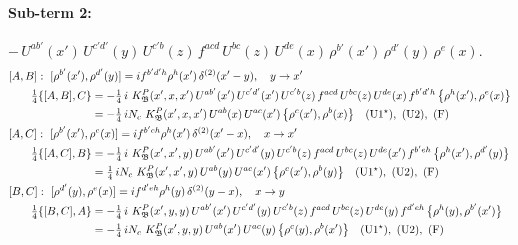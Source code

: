 \documentclass[10pt]{article}
\numberwithin{equation}{section}
\begin{document}
\paragraph{Sub-term 2:} $-\,U^{ab'}(x')\,U^{c'd'}(y)\,U^{c'b}(z)\,f^{acd}\,U^{bc}(z)\,U^{de}(x)\,\rho^{b'}(x')\,\rho^{d'}(y)\,\rho^{e}(x)$.
\begin{align}
&[A,B]:\ [\rho^{b'}(x'),\rho^{d'}(y)]=i f^{b'd'h}\rho^{h}(x')\,\delta^{(2)}(x'-y),\quad y\to x'\notag\\
&\qquad \tfrac14\{[A,B],C\}=-\tfrac14\,i\,\,K^{P}_{\mathfrak B}(x',x,x')\,U^{ab'}(x')\,U^{c'd'}(x')\,U^{c'b}(z)\,f^{acd}\,U^{bc}(z)\,U^{de}(x)\,f^{b'd'h}\,\big\{\rho^{h}(x'),\rho^{e}(x)\big\}\notag\\
&\qquad\phantom{\tfrac14\{[A,B],C\}}=-\tfrac14\,i N_{c}\,\,K^{P}_{\mathfrak B}(x',x,x')\,U^{ab}(x)\,U^{ac}(x')\,\big\{\rho^{c}(x'),\rho^{b}(x)\big\}\quad\text{(U1$^\star$)},\ \text{(U2)},\ \text{(F)}
\label{eq:GIII.I.P-2-AB}\\
&[A,C]:\ [\rho^{b'}(x'),\rho^{e}(x)]=i f^{b'eh}\rho^{h}(x')\,\delta^{(2)}(x'-x),\quad x\to x'\notag\\
&\qquad \tfrac14\{[A,C],B\}=-\tfrac14\,i\,\,K^{P}_{\mathfrak B}(x',x',y)\,U^{ab'}(x')\,U^{c'd'}(y)\,U^{c'b}(z)\,f^{acd}\,U^{bc}(z)\,U^{de}(x')\,f^{b'eh}\,\big\{\rho^{h}(x'),\rho^{d'}(y)\big\}\notag\\
&\qquad\phantom{\tfrac14\{[A,C],B\}}=\tfrac14\,i N_{c}\,\,K^{P}_{\mathfrak B}(x',x',y)\,U^{ab}(y)\,U^{ac}(x')\,\big\{\rho^{c}(x'),\rho^{b}(y)\big\}\quad\text{(U1$^\star$)},\ \text{(U2)},\ \text{(F)}
\label{eq:GIII.I.P-2-AC}\\
&[B,C]:\ [\rho^{d'}(y),\rho^{e}(x)]=i f^{d'eh}\rho^{h}(y)\,\delta^{(2)}(y-x),\quad x\to y\notag\\
&\qquad \tfrac14\{[B,C],A\}=-\tfrac14\,i\,\,K^{P}_{\mathfrak B}(x',y,y)\,U^{ab'}(x')\,U^{c'd'}(y)\,U^{c'b}(z)\,f^{acd}\,U^{bc}(z)\,U^{de}(y)\,f^{d'eh}\,\big\{\rho^{h}(y),\rho^{b'}(x')\big\}\notag\\
&\qquad\phantom{\tfrac14\{[B,C],A\}}=-\tfrac14\,i N_{c}\,\,K^{P}_{\mathfrak B}(x',y,y)\,U^{ab}(x')\,U^{ac}(y)\,\big\{\rho^{c}(y),\rho^{b}(x')\big\}\quad\text{(U1$^\star$)},\ \text{(U2)},\ \text{(F)}
\label{eq:GIII.I.P-2-BC}
\end{align}
\end{document}
